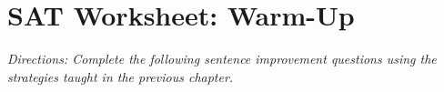 \section{SAT Worksheet: Warm-Up}

\textit{Directions: Complete the following sentence improvement questions using the strategies taught in the previous chapter.}
